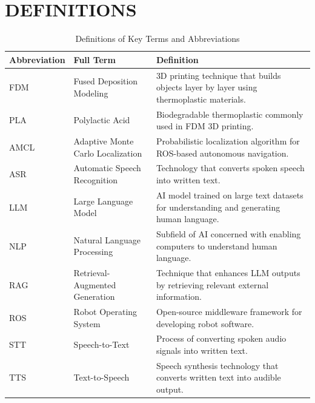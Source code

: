 \section{DEFINITIONS}
\begin{table}[h]
\captionsetup{justification=raggedright,singlelinecheck=false,margin=0pt,indention=0pt}
\caption{Definitions of Key Terms and Abbreviations}
\label{tab:abbreviations}
\noindent
{\fontsize{16pt}{19.2pt}\selectfont
\renewcommand{\arraystretch}{1.35}
\setlength{\tabcolsep}{8pt}
\begin{tabular*}{\textwidth}{@{\extracolsep{\fill}}l|p{3.5cm}|p{8cm}}
\hline
\textbf{Abbreviation} & \textbf{Full Term} & \textbf{Definition} \\ \hline
FDM   & Fused Deposition Modeling              & 3D printing technique that builds objects layer by layer using thermoplastic materials. \\ \hline
PLA   & Polylactic Acid                        & Biodegradable thermoplastic commonly used in FDM 3D printing. \\ \hline
AMCL  & Adaptive Monte Carlo Localization      & Probabilistic localization algorithm for ROS-based autonomous navigation. \\ \hline
ASR   & Automatic Speech Recognition           & Technology that converts spoken speech into written text. \\ \hline
LLM   & Large Language Model                   & AI model trained on large text datasets for understanding and generating human language. \\ \hline
NLP   & Natural Language Processing            & Subfield of AI concerned with enabling computers to understand human language. \\ \hline
RAG   & Retrieval-Augmented Generation         & Technique that enhances LLM outputs by retrieving relevant external information. \\ \hline
ROS   & Robot Operating System                 & Open-source middleware framework for developing robot software. \\ \hline
STT   & Speech-to-Text                         & Process of converting spoken audio signals into written text. \\ \hline
TTS   & Text-to-Speech                         & Speech synthesis technology that converts written text into audible output. \\ \hline
\end{tabular*}
}
\end{table}

